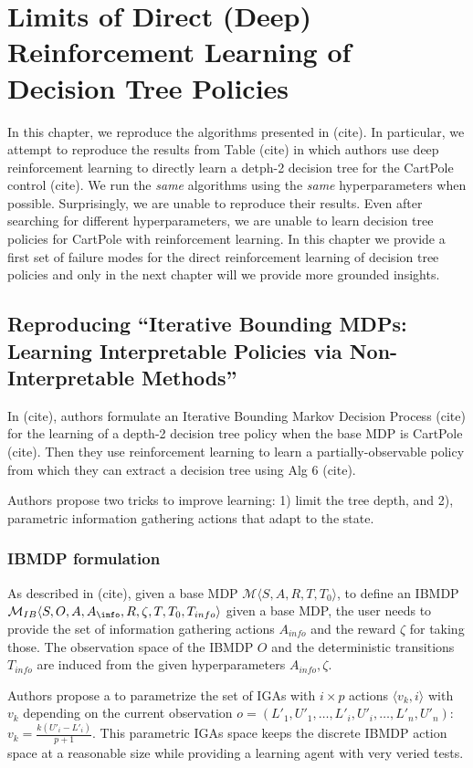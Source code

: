 \chapter{Limits of Direct (Deep) Reinforcement Learning of Decision Tree Policies}
In this chapter, we reproduce the algorithms presented in (cite). In particular, we attempt to reproduce the results from Table (cite) in which authors use deep reinforcement learning to directly learn a detph-2 decision tree for the CartPole control (cite).
We run the \textit{same} algorithms using the \textit{same} hyperparameters when possible.
Surprisingly, we are unable to reproduce their results. Even after searching for different hyperparameters, we are unable to learn decision tree policies for CartPole with reinforcement learning. 
In this chapter we provide a first set of failure modes for the direct reinforcement learning of decision tree policies and only in the next chapter will we provide more grounded insights.

\section{Reproducing ``Iterative Bounding MDPs: Learning Interpretable Policies via Non-Interpretable Methods''}
In (cite), authors formulate an Iterative Bounding Markov Decision Process (cite) for the learning of a depth-2 decision tree policy when the base MDP is CartPole (cite).
Then they use reinforcement learning to learn a partially-observable policy from which they can extract a decision tree using Alg 6 (cite). 

Authors propose two tricks to improve learning: 1) limit the tree depth, and 2), parametric information gathering actions that adapt to the state.

\subsection{IBMDP formulation}
As described in (cite), given a base MDP $\mathcal{M}\langle S, A, R, T, T_0\rangle$, to define an IBMDP $\mathcal{M}_{IB}\langle S, O, A, A_{\info}, R, \zeta, T, T_0, T_{info}\rangle$ given a base MDP, the user needs to provide the set of information gathering actions $A_{info}$ and the reward $\zeta$ for taking those.
The observation space of the IBMDP $O$ and the deterministic transitions $T_{info}$ are induced from the given hyperparameters $A_{info}, \zeta$.

Authors propose a to parametrize the set of IGAs with $i \times p$ actions $\langle v_k, i \rangle$ with $v_k$ depending on the current observation $o=(L'_1, U'_1, \dots, L'_i, U'_i, \dots, L'_n, U'_n)$: $v_k = \frac{k(U'_i - L'_i)}{p+1}$.
This parametric IGAs space keeps the discrete IBMDP action space at a reasonable size while providing a learning agent with very veried tests.

